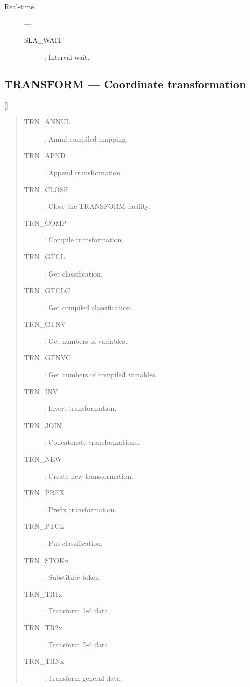 \begin{description}
\item [Real-time] ---

\begin{description}
\item [SLA\_WAIT] : Interval wait.
\end{description}

\end{description}

\newpage

\subsection{TRANSFORM --- Coordinate transformation} 

\vspace{-9mm}

\hfill []

\vspace{2mm}

\begin{quote}
\begin{description}
\item [TRN\_ANNUL] : Annul compiled mapping.
\item [TRN\_APND] : Append transformation.
\item [TRN\_CLOSE] : Close the TRANSFORM facility.
\item [TRN\_COMP] : Compile transformation.
\item [TRN\_GTCL] : Get classification.
\item [TRN\_GTCLC] : Get compiled classification.
\item [TRN\_GTNV] : Get numbers of variables.
\item [TRN\_GTNVC] : Get numbers of compiled variables.
\item [TRN\_INV] : Invert transformation.
\item [TRN\_JOIN] : Concatenate transformations.
\item [TRN\_NEW] : Create new transformation.
\item [TRN\_PRFX] : Prefix transformation.
\item [TRN\_PTCL] : Put classification.
\item [TRN\_STOKx] : Substitute token.
\item [TRN\_TR1x] : Transform 1-d data.
\item [TRN\_TR2x] : Transform 2-d data.
\item [TRN\_TRNx] : Transform general data.
\end{description}
\end{quote}

